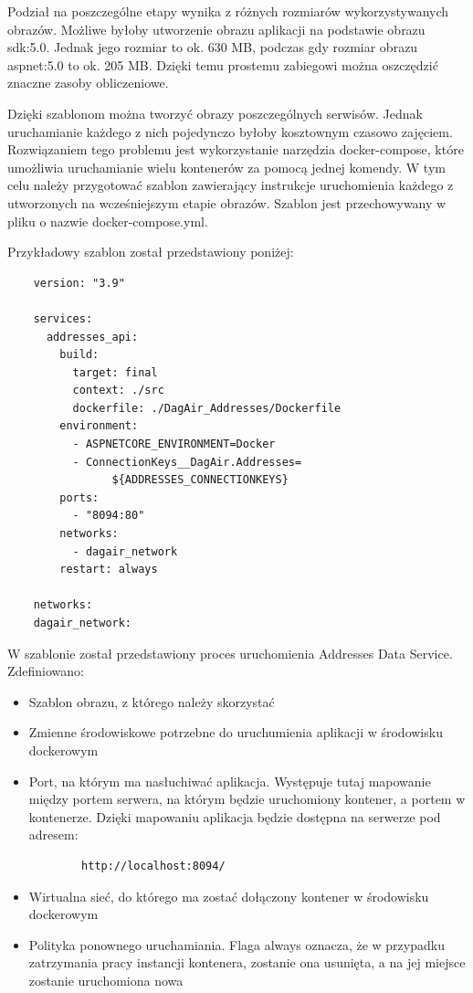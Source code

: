 \documentclass[11pt, a4]{article} %
\begin{document}
Podział na poszczególne etapy wynika z różnych rozmiarów wykorzystywanych obrazów. Możliwe byłoby
utworzenie obrazu aplikacji na podstawie obrazu sdk:5.0. Jednak jego rozmiar to ok. 630 MB, podczas
gdy rozmiar obrazu aspnet:5.0 to ok. 205 MB. Dzięki temu prostemu zabiegowi można oszczędzić 
znaczne zasoby obliczeniowe. 

Dzięki szablonom można tworzyć obrazy poszczególnych serwisów. Jednak uruchamianie każdego z nich
pojedynczo byłoby kosztownym czasowo zajęciem. Rozwiązaniem tego problemu jest wykorzystanie narzędzia
docker-compose, które umożliwia uruchamianie wielu kontenerów za pomocą jednej komendy. W tym celu
należy przygotować szablon zawierający instrukcje uruchomienia każdego z utworzonych na wcześniejszym
etapie obrazów. Szablon jest przechowywany w pliku o nazwie docker-compose.yml.

Przykładowy szablon został przedstawiony poniżej:

\begin{lstlisting}
    version: "3.9"

    services:
      addresses_api:
        build:
          target: final
          context: ./src
          dockerfile: ./DagAir_Addresses/Dockerfile
        environment:
          - ASPNETCORE_ENVIRONMENT=Docker
          - ConnectionKeys__DagAir.Addresses=
                ${ADDRESSES_CONNECTIONKEYS}
        ports:
          - "8094:80"
        networks:
          - dagair_network
        restart: always

    networks:
    dagair_network:
\end{lstlisting}

W szablonie został przedstawiony proces uruchomienia Addresses Data Service. Zdefiniowano:

\begin{itemize}
    \item Szablon obrazu, z którego należy skorzystać
    \item Zmienne środowiskowe potrzebne do uruchumienia aplikacji w środowisku dockerowym
    \item Port, na którym ma nasłuchiwać aplikacja. Występuje tutaj mapowanie między portem 
    serwera, na którym będzie uruchomiony kontener, a portem w kontenerze. Dzięki mapowaniu
    aplikacja będzie dostępna na serwerze pod adresem:

    \begin{lstlisting}
        http://localhost:8094/
    \end{lstlisting}
    \item Wirtualna sieć, do którego ma zostać dołączony kontener w środowisku dockerowym
    \item Polityka ponownego uruchamiania. Flaga always oznacza, że w przypadku zatrzymania pracy
    instancji kontenera, zostanie ona usunięta, a na jej miejsce zostanie uruchomiona nowa
\end{itemize}
\end{document}
